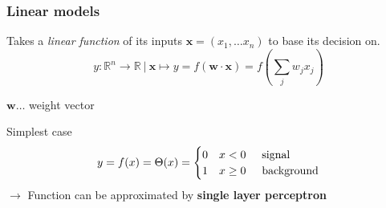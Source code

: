 \documentclass{beamer}
\begin{document}
\begin{frame}
    \frametitle{Linear models}
    Takes a \emph{linear function} of its inputs $\boldsymbol{x} = (x_{1},\dots x_{n})$ to base its decision on.\\
    $$ y: \mathbb{R}^{n} \to \mathbb{R}~|~\boldsymbol{x} \mapsto y = f (\boldsymbol{w} \cdot \boldsymbol{x}) = f (\sum_{j}w_{j}x_{j}) $$
    
    $\boldsymbol{w}\dots$ weight vector\\ 
    \vspace*{4mm}

    \pause
    Simplest case
    \[ 
         y = f(x)=\Theta(x)=
         \begin{cases} 
             0 & x < 0 \hspace*{5mm}\text{signal}\\
             1  & x \geq 0 \hspace*{5mm}\text{background}
        \end{cases} 
    \] 
    \pause
    \hspace*{5mm}$\to$ Function can be approximated by \textbf{single layer perceptron}
    
\end{frame} 
\end{document}
